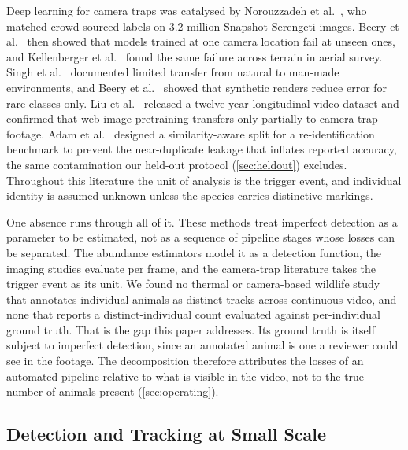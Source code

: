 Deep learning for camera traps was catalysed by Norouzzadeh et
al.~\cite{norouzzadeh2018automatically}, who matched crowd-sourced labels on 3.2 million
Snapshot Serengeti images. Beery et al.~\cite{beery2018recognition} then showed that models
trained at one camera location fail at unseen ones, and Kellenberger et
al.~\cite{kellenberger2018detecting} found the same failure across terrain in aerial
survey. Singh et al.~\cite{singh2020animal} documented limited transfer from natural to
man-made environments, and Beery et al.~\cite{beery2020synthetic} showed that synthetic
renders reduce error for rare classes only. Liu et al.~\cite{liu2023lote} released a
twelve-year longitudinal video dataset and confirmed that web-image pretraining transfers
only partially to camera-trap footage. Adam et al.~\cite{adam2025wildlifereid10k} designed a
similarity-aware split for a re-identification benchmark to prevent the near-duplicate
leakage that inflates reported accuracy, the same contamination our held-out protocol
(\cref{sec:heldout}) excludes. Throughout this literature the unit of analysis is the
trigger event, and individual identity is assumed unknown unless the species carries
distinctive markings.

One absence runs through all of it. These methods treat imperfect detection as a parameter
to be estimated, not as a sequence of pipeline stages whose losses can be separated. The
abundance estimators model it as a detection function, the imaging studies evaluate per
frame, and the camera-trap literature takes the trigger event as its unit. We found no
thermal or camera-based wildlife study that annotates individual animals as distinct tracks
across continuous video, and none that reports a distinct-individual count evaluated against
per-individual ground truth. That is the gap this paper addresses. Its ground truth is
itself subject to imperfect detection, since an annotated animal is one a reviewer could see
in the footage. The decomposition therefore attributes the losses of an automated pipeline
relative to what is visible in the video, not to the true number of animals present
(\cref{sec:operating}).

\subsection{Detection and Tracking at Small Scale}
\label{sec:rw:detect}

